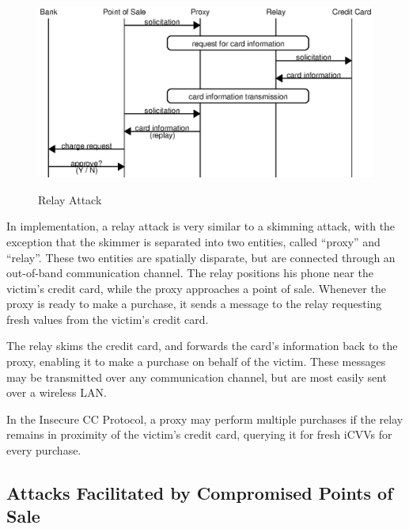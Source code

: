 \begin{figure}
  \caption{Relay Attack}
  \centering
    \includegraphics{img/attack-3-relay.eps}
  \label{fig:insecure-relay}
\end{figure}

In implementation, a relay attack is very similar to a skimming attack, with the exception that the skimmer is separated into two entities, called ``proxy'' and ``relay''.
These two entities are spatially disparate, but are connected through an out-of-band communication channel.
The relay positions his phone near the victim's credit card, while the proxy approaches a point of sale.
Whenever the proxy is ready to make a purchase, it sends a message to the relay requesting fresh values from the victim's credit card.

The relay skims the credit card, and forwards the card's information back to the proxy, enabling it to make a purchase on behalf of the victim.
These messages may be transmitted over any communication channel, but are most easily sent over a wireless LAN.

In the Insecure CC Protocol, a proxy may perform multiple purchases if the relay remains in proximity of the victim's credit card, querying it for fresh iCVVs for every purchase.





\subsection{Attacks Facilitated by Compromised Points of Sale}
\label{sec:insecure-compromised}

